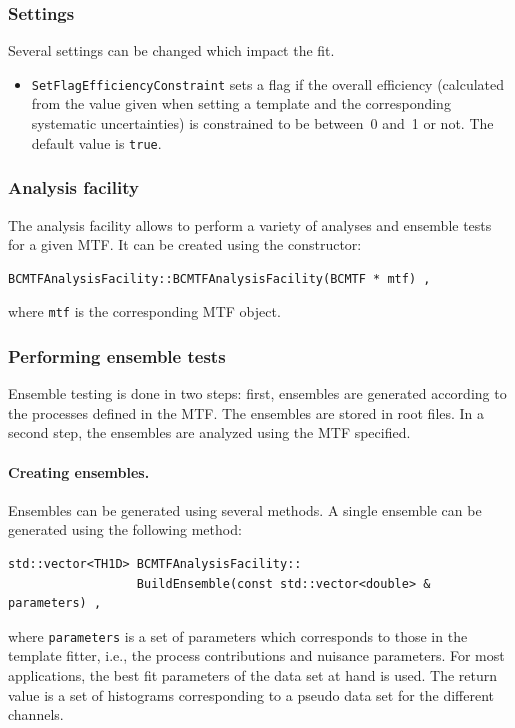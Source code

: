 \documentclass[11pt, a4paper]{article}
\begin{document}
\subsubsection{Settings}
\label{section:mtfsettings}

Several settings can be changed which impact the fit.
%
\begin{itemize}
\item \verb|SetFlagEfficiencyConstraint| sets a flag if the overall
  efficiency (calculated from the value given when setting a template
  and the corresponding systematic uncertainties) is constrained to be
  between~0 and~1 or not. The default value is \verb|true|.
\end{itemize}

\subsubsection{Analysis facility}
\label{section:facility}

The analysis facility allows to perform a variety of analyses and
ensemble tests for a given MTF. It can be created using the
constructor:
%
\begin{verbatim}
BCMTFAnalysisFacility::BCMTFAnalysisFacility(BCMTF * mtf) ,
\end{verbatim}
%
where \verb|mtf| is the corresponding MTF object.

\subsubsection{Performing ensemble tests}

Ensemble testing is done in two steps: first, ensembles are generated
according to the processes defined in the MTF. The ensembles are
stored in root files. In a second step, the ensembles are analyzed
using the MTF specified.

\paragraph{Creating ensembles.}

Ensembles can be generated using several methods. A single ensemble
can be generated using the following method:
%
\begin{verbatim}
std::vector<TH1D> BCMTFAnalysisFacility::
                  BuildEnsemble(const std::vector<double> & parameters) ,
\end{verbatim}
%
where \verb|parameters| is a set of parameters which corresponds to
those in the template fitter, i.e., the process contributions and
nuisance parameters. For most applications, the best fit parameters of
the data set at hand is used. The return value is a set of histograms
corresponding to a pseudo data set for the different channels.
\end{document}
